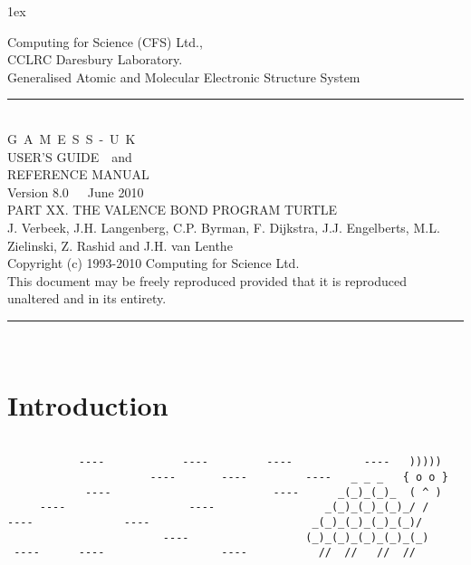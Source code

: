 \documentclass[11pt,fleqn]{article}
\begin{document}
\sf
\parindent 0cm
\parskip 1ex
\begin{flushleft}
 
Computing for Science (CFS) Ltd.,\\CCLRC Daresbury Laboratory.\\[0.30in]
{\large Generalised Atomic and Molecular Electronic Structure System }\\[.2in]
\rule{150mm}{3mm}\\
\vspace{.2in}
{\huge G~A~M~E~S~S~-~U~K}\\[.3in]
{\huge USER'S GUIDE~~and}\\[.2in]
{\huge REFERENCE MANUAL}\\[0.2in]
{\huge Version 8.0~~~June 2010}\\ [.2in]
{\large PART XX. THE VALENCE BOND PROGRAM TURTLE }\\
{\large J. Verbeek, J.H. Langenberg, C.P. Byrman, F. Dijkstra, J.J. Engelberts,
M.L. Zielinski, Z. Rashid and J.H. van Lenthe}\\[0.2in]
 
Copyright (c) 1993-2010 Computing for Science Ltd.\\[.1in]
This document may be freely reproduced provided that it is reproduced\\
unaltered and in its entirety.\\
\vspace{.2in}
\rule{150mm}{5mm}\\
\end{flushleft}


\tableofcontents

\newpage


\section[Introduction]{Introduction}

\begin{verbatim}

           ----            ----         ----           ----   )))))
                      ----       ----         ----   _ _ _   { o o }
            ----                         ----      _(_)_(_)_  ( ^ )
     ----                   ----                 _(_)_(_)_(_)_/ /
----              ----                         _(_)_(_)_(_)_(_)/
                        ----                  (_)_(_)_(_)_(_)_(_)
 ----      ----                  ----           //  //   //  //
\end{verbatim}
\end{document}
